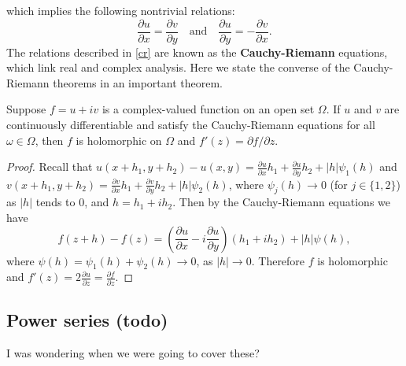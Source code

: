 which implies the following nontrivial relations: 
\begin{equation}\label{cr}
    \frac{\partial u}{\partial x}=\frac{\partial v}{\partial y}\quad \text{and}\quad \frac{\partial u}{\partial y}=-\frac{\partial v}{\partial x}.
\end{equation}
The relations described in \cref{cr} are known as the \textbf{Cauchy-Riemann} equations, which link real and complex analysis. Here we state the converse of the Cauchy-Riemann theorems in an important theorem.
\begin{theorem}
    Suppose $f=u+iv$ is a complex-valued function on an open set $\Omega$. If $u$ and $v$ are continuously differentiable and satisfy the Cauchy-Riemann equations for all $\omega\in \Omega$, then $f$ is holomorphic on $\Omega$ and $f'(z)=\partial f / \partial z$.
\end{theorem}
\begin{proof}
    Recall that $u(x+h_1,y+h_2)-u(x,y)=\frac{\partial u}{\partial x}h_1+\frac{\partial u}{\partial y}h_2+ |h|\psi_1(h) $ and $v(x+h_1,y+h_2)=\frac{\partial v}{\partial x}h_1+\frac{\partial v}{\partial y}h_2+|h|\psi_2(h)$, where $\psi_j(h)\to 0$ (for $j\in \{1,2\} $) as $|h|$ tends to $0$, and $h=h_1+ih_2$. Then by the Cauchy-Riemann equations we have \[
        f(z+h)-f(z)=\left( \frac{\partial u}{\partial x}-i \frac{\partial u}{\partial y} \right) (h_1+ih_2)+|h|\psi(h),
    \] where $\psi(h)=\psi_1(h)+\psi_2(h)\to 0$, as $|h|\to 0$. Therefore $f$ is holomorphic and $f'(z)=2 \frac{\partial u}{\partial z}=\frac{\partial f}{\partial z}$.
\end{proof}


\subsection{Power series (todo)}
I was wondering when we were going to cover these?

